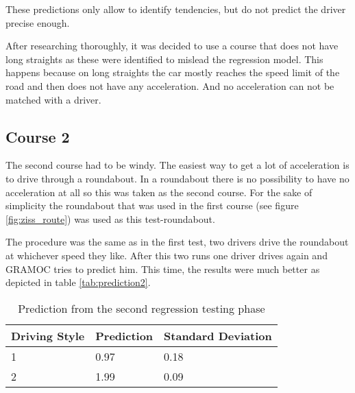 These predictions only allow to identify tendencies, but do not predict the driver precise enough.

After researching thoroughly, it was decided to use a course that does not have long straights as these were identified to mislead the regression model. This happens because on long straights the car mostly reaches the speed limit of the road and then does not have any acceleration. And no acceleration can not be matched with a driver.

\subsection{Course 2}

The second course had to be windy. The easiest way to get a lot of acceleration is to drive through a roundabout. In a roundabout there is no possibility to have no acceleration at all so this was taken as the second course. For the sake of simplicity the roundabout that was used in the first course (see figure \vref{fig:ziss_route}) was used as this test-roundabout.

The procedure was the same as in the first test, two drivers drive the roundabout at whichever speed they like. After this two runs one driver drives again and GRAMOC tries to predict him. This time, the results were much better as depicted in table \vref{tab:prediction2}.

\begin{table}[H]
\centering
\begin{tabular}{|l|l|l|}
\hline
\textbf{Driving Style} & \textbf{Prediction} & \textbf{Standard Deviation} \\ \hline
1                      & 0.97                & 0.18 \\ \hline
2                      & 1.99                & 0.09 \\ \hline
\end{tabular}
\caption{Prediction from the second regression testing phase}
\label{tab:prediction2}
\end{table}

